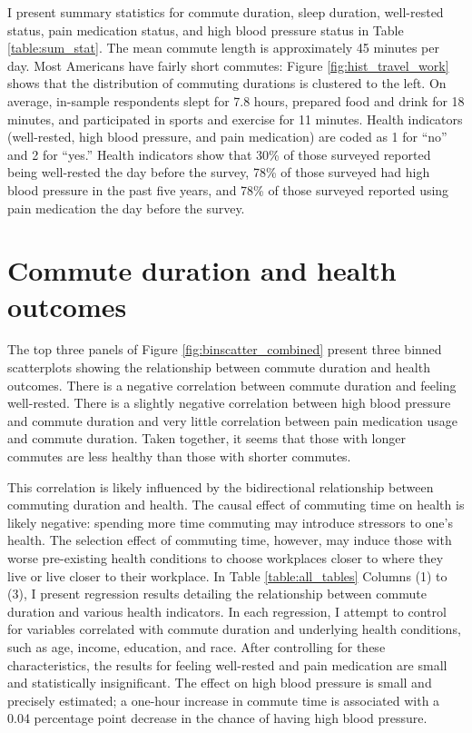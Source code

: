 \documentclass{eco481_paper}
\begin{document}
I present summary statistics for commute duration, sleep duration, well-rested status, pain medication status, and high blood pressure status in Table \ref{table:sum_stat}. The mean commute length is approximately 45 minutes per day. Most Americans have fairly short commutes: Figure \ref*{fig:hist_travel_work} shows that the distribution of commuting durations is clustered to the left. On average, in-sample respondents slept for 7.8 hours, prepared food and drink for 18 minutes, and participated in sports and exercise for 11 minutes. Health indicators (well-rested, high blood pressure, and pain medication) are coded as 1 for “no” and 2 for “yes.” Health indicators show that 30\% of those surveyed reported being well-rested the day before the survey, 78\% of those surveyed had high blood pressure in the past five years, and 78\% of those surveyed reported using pain medication the day before the survey. 


\section*{Commute duration and health outcomes}
The top three panels of Figure \ref*{fig:binscatter_combined} present three binned scatterplots showing the relationship between commute duration and health outcomes. There is a negative correlation between commute duration and feeling well-rested. There is a slightly negative correlation between high blood pressure and commute duration and very little correlation between pain medication usage and commute duration. Taken together, it seems that those with longer commutes are less healthy than those with shorter commutes. 

This correlation is likely influenced by the bidirectional relationship between commuting duration and health. The causal effect of commuting time on health is likely negative: spending more time commuting may introduce stressors to one’s health. The selection effect of commuting time, however, may induce those with worse pre-existing health conditions to choose workplaces closer to where they live or live closer to their workplace. In Table \ref{table:all_tables} Columns (1) to (3), I present regression results detailing the relationship between commute duration and various health indicators. In each regression, I attempt to control for variables correlated with commute duration and underlying health conditions, such as age, income, education, and race. After controlling for these characteristics, the results for feeling well-rested and pain medication are small and statistically insignificant. The effect on high blood pressure is small and precisely estimated; a one-hour increase in commute time is associated with a 0.04 percentage point decrease in the chance of having high blood pressure.
\end{document}
